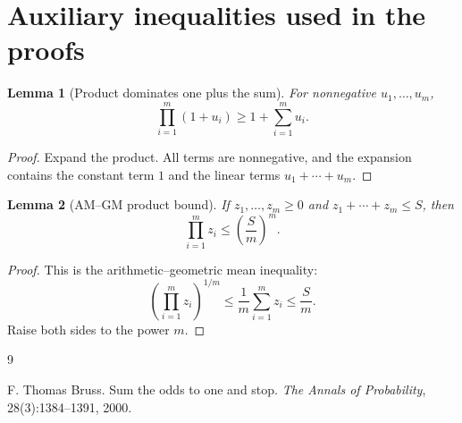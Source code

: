 \documentclass[11pt,a4paper]{article}
\newtheorem{lemma}{Lemma}
\begin{document}
\appendix

\section{Auxiliary inequalities used in the proofs}

\begin{lemma}[Product dominates one plus the sum]
For nonnegative \(u_1,\dots,u_m\),
\[
  \prod_{i=1}^m(1+u_i)\ge1+\sum_{i=1}^m u_i.
\]
\end{lemma}

\begin{proof}
Expand the product.  All terms are nonnegative, and the expansion contains the
constant term \(1\) and the linear terms \(u_1+\cdots+u_m\).
\end{proof}

\begin{lemma}[AM--GM product bound]
If \(z_1,
\dots,z_m\ge0\) and \(z_1+\cdots+z_m\le S\), then
\[
  \prod_{i=1}^m z_i\le\left(\frac{S}{m}\right)^m.
\]
\end{lemma}

\begin{proof}
This is the arithmetic--geometric mean inequality:
\[
  \left(\prod_{i=1}^m z_i\right)^{1/m}
  \le
  \frac1m\sum_{i=1}^m z_i
  \le
  \frac{S}{m}.
\]
Raise both sides to the power \(m\).
\end{proof}

\begin{thebibliography}{9}

F. Thomas Bruss.
\newblock Sum the odds to one and stop.
\newblock \emph{The Annals of Probability}, 28(3):1384--1391, 2000.

\end{thebibliography}
\end{document}
